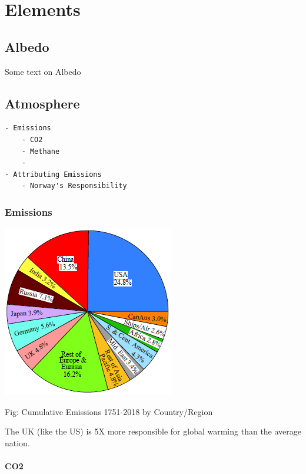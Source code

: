 \documentclass[
]{book}
\begin{document}
\hypertarget{part-elements}{%
\part{Elements}\label{part-elements}}

\hypertarget{albedo}{%
\chapter{Albedo}\label{albedo}}

Some text on Albedo

\hypertarget{atmosphere}{%
\chapter{Atmosphere}\label{atmosphere}}

\begin{verbatim}
- Emissions
    - CO2    
    - Methane
    -
- Attributing Emissions
    - Norway's Responsibility
\end{verbatim}

\hypertarget{emissions}{%
\section{Emissions}\label{emissions}}

\includegraphics{fig/Emissions_Sum_1751-2018_by_Region.png}

Fig: Cumulative Emissions 1751-2018 by Country/Region

The UK (like the US) is 5X more responsible for global warming than the average nation.

\hypertarget{co2}{%
\subsection{CO2}\label{co2}}
\end{document}
